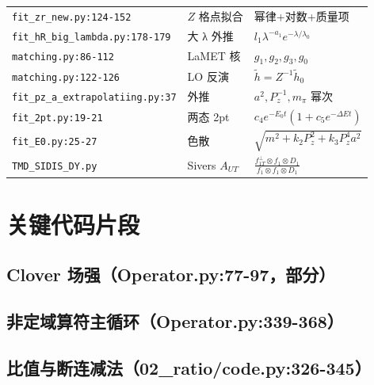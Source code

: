 \documentclass[UTF8]{ctexart}
\begin{document}
\begin{table}[h]
\begin{tabular}{lll}
\texttt{fit\_zr\_new.py:124-152} & $Z$ 格点拟合 & 幂律+对数+质量项 \\
\texttt{fit\_hR\_big\_lambda.py:178-179} & 大 λ 外推 & $l_1\lambda^{-a_1}e^{-\lambda/\lambda_0}$ \\
\texttt{matching.py:86-112} & LaMET 核 & $g_1,g_2,g_3,g_0$ \\
\texttt{matching.py:122-126} & LO 反演 & $\tilde h=Z^{-1}\tilde h_0$ \\
\texttt{fit\_pz\_a\_extrapolatiing.py:37} & 外推 & $a^2,P_z^{-1},m_\pi$ 幂次 \\
\texttt{fit\_2pt.py:19-21} & 两态 2pt & $c_4e^{-E_0t}(1+c_5e^{-\Delta Et})$ \\
\texttt{fit\_E0.py:25-27} & 色散 & $\sqrt{m^2+k_2P_z^2+k_3P_z^4a^2}$ \\
\texttt{TMD\_SIDIS\_DY.py} & Sivers $A_{UT}$ & $\frac{f_{1T}^\perp\otimes f_1\otimes D_1}{f_1\otimes f_1\otimes D_1}$ \\
\bottomrule
\end{tabular}
\end{table}

\section{关键代码片段}

\subsection{Clover 场强（Operator.py:77-97，部分）}



\subsection{非定域算符主循环（Operator.py:339-368）}



\subsection{比值与断连减法（02\_ratio/code.py:326-345）}


\end{document}
